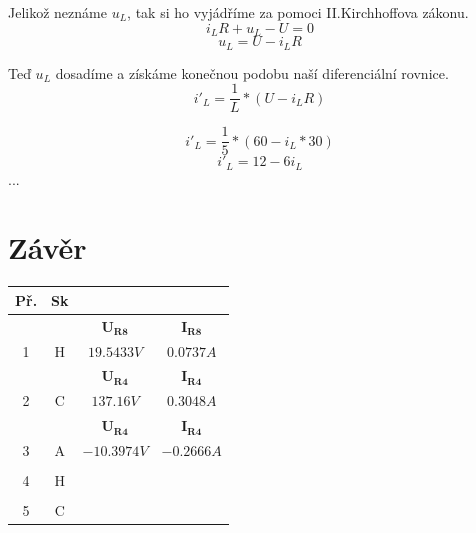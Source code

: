 \documentclass[a4paper, 12pt]{article}
\begin{document}
Jelikož neznáme $u_L$, tak si ho vyjádříme za pomoci II.Kirchhoffova zákonu.
$$ i_LR + u_L - U = 0 $$
$$ u_L = U - i_LR $$

Teď $u_L$ dosadíme a získáme konečnou podobu naší diferenciální rovnice.
$$ i'_L = \frac{1}{L}*(U -i_LR) $$


$$ i'_L = \frac{1}{5}*(60-i_L*30) $$
$$ i'_L = 12 - 6i_L $$
...

\newpage
\section{Závěr}

\begin{tabular}{|c|c|c|c|}
    \hline
    Př. & Sk & \multicolumn{2}{|c|}{}
    \\ \hline
    \multicolumn{2}{|c|}{} & $\mathbf{U_{R8}}$ & $\mathbf{I_{R8}}$
    \\ \hline
    1 & H & $19.5433V$ & $0.0737A$
    \\ \hline
    \multicolumn{2}{|c|}{} & $\mathbf{U_{R4}}$ & $\mathbf{I_{R4}}$
    \\ \hline
    2 & C & $137.16V$ & $0.3048A$
    \\ \hline
    \multicolumn{2}{|c|}{} & $\mathbf{U_{R4}}$ & $\mathbf{I_{R4}}$
    \\ \hline
    3 & A & $-10.3974V$ & $-0.2666A$
    \\ \hline
    \multicolumn{2}{|c|}{} &  & 
    \\ \hline
    4 & H &  & 
    \\ \hline
    \multicolumn{2}{|c|}{} &  & 
    \\ \hline
    5 & C &  & 
    
    \\ \hline
\end{tabular}
\end{document}
